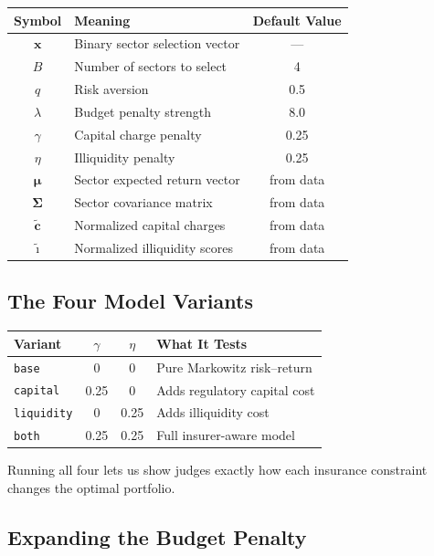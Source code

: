 \documentclass[12pt, a4paper]{article}
\begin{document}
\begin{center}
\begin{tabular}{clc}
\toprule
\textbf{Symbol} & \textbf{Meaning} & \textbf{Default Value} \\
\midrule
$\mathbf{x}$ & Binary sector selection vector & --- \\
$B$ & Number of sectors to select & 4 \\
$q$ & Risk aversion & 0.5 \\
$\lambda$ & Budget penalty strength & 8.0 \\
$\gamma$ & Capital charge penalty & 0.25 \\
$\eta$ & Illiquidity penalty & 0.25 \\
$\bm{\mu}$ & Sector expected return vector & from data \\
$\bm{\Sigma}$ & Sector covariance matrix & from data \\
$\tilde{\mathbf{c}}$ & Normalized capital charges & from data \\
$\tilde{\bm{\imath}}$ & Normalized illiquidity scores & from data \\
\bottomrule
\end{tabular}
\end{center}

\subsection{The Four Model Variants}

\begin{center}
\begin{tabular}{lccl}
\toprule
\textbf{Variant} & $\gamma$ & $\eta$ & \textbf{What It Tests} \\
\midrule
\texttt{base} & 0 & 0 & Pure Markowitz risk--return \\
\texttt{capital} & 0.25 & 0 & Adds regulatory capital cost \\
\texttt{liquidity} & 0 & 0.25 & Adds illiquidity cost \\
\texttt{both} & 0.25 & 0.25 & Full insurer-aware model \\
\bottomrule
\end{tabular}
\end{center}

Running all four lets us show judges exactly how each insurance constraint
changes the optimal portfolio.

\subsection{Expanding the Budget Penalty}
\end{document}
